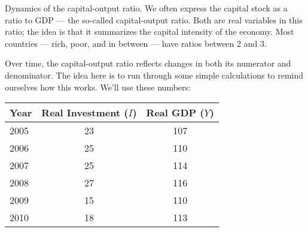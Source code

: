\documentclass[12pt]{exam}
\begin{document}
\begin{questions}
\begin{solution}
\end{solution}


\question Dynamics of the capital-output ratio.
We often express the capital stock as a ratio to GDP ---
the so-called capital-output ratio.
Both are real variables in this ratio;
the idea is that it summarizes the capital intensity
of the economy.
Most countries --- rich, poor, and in between ---
have ratios between 2 and 3.

Over time, the capital-output ratio reflects changes
in both its numerator and denominator.
The idea here is to run through some simple calculations
to remind ourselves how this works.
We'll use these numbers:

\begin{center}
\begin{tabular}{lcc}
\toprule
Year \phantom{xxxxx}   & Real Investment ($I$)  &  Real GDP ($Y$) \\
\midrule
2005    &  23  &  107 \\
2006    &  25  &  110 \\
2007    &  25  &  114 \\
2008    &  27  &  116 \\
2009    &  15  &  110 \\
2010    &  18  &  113 \\
\bottomrule
\end{tabular}
\end{center}
%




\end{questions}
\end{document}
